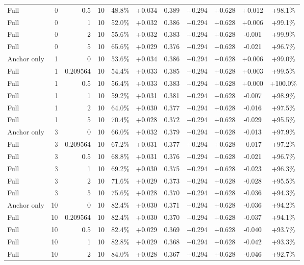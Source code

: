 \begin{table}[htbp]
\begin{tabular}{lrrrccccccc}
Full & 0 & 0.5 & 10 & 48.8\% & +0.034 & 0.389 & +0.294 & +0.628 & +0.012 & +98.1\% \\
Full & 0 & 1 & 10 & 52.0\% & +0.032 & 0.386 & +0.294 & +0.628 & +0.006 & +99.1\% \\
Full & 0 & 2 & 10 & 55.6\% & +0.032 & 0.383 & +0.294 & +0.628 & -0.001 & +99.9\% \\
Full & 0 & 5 & 10 & 65.6\% & +0.029 & 0.376 & +0.294 & +0.628 & -0.021 & +96.7\% \\
Anchor only & 1 & 0 & 10 & 53.6\% & +0.034 & 0.386 & +0.294 & +0.628 & +0.006 & +99.0\% \\
Full & 1 & 0.209564 & 10 & 54.4\% & +0.033 & 0.385 & +0.294 & +0.628 & +0.003 & +99.5\% \\
Full & 1 & 0.5 & 10 & 56.4\% & +0.033 & 0.383 & +0.294 & +0.628 & +0.000 & +100.0\% \\
Full & 1 & 1 & 10 & 59.2\% & +0.031 & 0.381 & +0.294 & +0.628 & -0.007 & +98.9\% \\
Full & 1 & 2 & 10 & 64.0\% & +0.030 & 0.377 & +0.294 & +0.628 & -0.016 & +97.5\% \\
Full & 1 & 5 & 10 & 70.4\% & +0.028 & 0.372 & +0.294 & +0.628 & -0.029 & +95.5\% \\
Anchor only & 3 & 0 & 10 & 66.0\% & +0.032 & 0.379 & +0.294 & +0.628 & -0.013 & +97.9\% \\
Full & 3 & 0.209564 & 10 & 67.2\% & +0.031 & 0.377 & +0.294 & +0.628 & -0.017 & +97.2\% \\
Full & 3 & 0.5 & 10 & 68.8\% & +0.031 & 0.376 & +0.294 & +0.628 & -0.021 & +96.7\% \\
Full & 3 & 1 & 10 & 69.2\% & +0.030 & 0.375 & +0.294 & +0.628 & -0.023 & +96.3\% \\
Full & 3 & 2 & 10 & 71.6\% & +0.029 & 0.373 & +0.294 & +0.628 & -0.028 & +95.5\% \\
Full & 3 & 5 & 10 & 75.6\% & +0.028 & 0.370 & +0.294 & +0.628 & -0.036 & +94.3\% \\
Anchor only & 10 & 0 & 10 & 82.4\% & +0.030 & 0.371 & +0.294 & +0.628 & -0.036 & +94.2\% \\
Full & 10 & 0.209564 & 10 & 82.4\% & +0.030 & 0.370 & +0.294 & +0.628 & -0.037 & +94.1\% \\
Full & 10 & 0.5 & 10 & 82.4\% & +0.029 & 0.369 & +0.294 & +0.628 & -0.040 & +93.7\% \\
Full & 10 & 1 & 10 & 82.8\% & +0.029 & 0.368 & +0.294 & +0.628 & -0.042 & +93.3\% \\
Full & 10 & 2 & 10 & 84.0\% & +0.028 & 0.367 & +0.294 & +0.628 & -0.046 & +92.7\% \\

\end{tabular}
\end{table}
